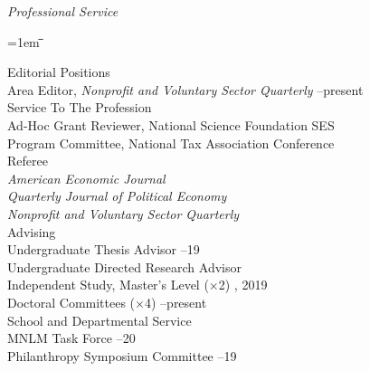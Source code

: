 \documentclass[12pt]{article}
\newlength{\midlength}
\newlength{\firstlength}
\newlength{\listindent}
\newlength{\dategap}
\newlength{\wrapgap}
\newcommand{\heading}[1]{
	{\setlength{\parskip}{0.8cm plus6mm minus3mm}
	\parindent=0pt
	\large \textit{{#1}}}
	\vspace{0.1em}
}
\newenvironment{datetabbing}{
	\begin{tabbing}
	\parskip=1em
	\hspace*{\listindent}\=\hspace*{\firstlength}\=\hspace*{\midlength}\= \kill
}{
	\end{tabbing}
}
\begin{document}
\clearpage
\heading{Professional Service}

\begin{datetabbing}	
\>  Editorial Positions																\\[\wrapgap]
\>	\>	Area Editor, \textit{Nonprofit and Voluntary Sector Quarterly}
															--present	\'	\\[\dategap]
\>  Service To The Profession														\\[\wrapgap]
\>	\>	Ad-Hoc Grant Reviewer, National Science Foundation SES				\'	\\[\wrapgap]
\>	\>	Program Committee, National Tax Association Conference 				\'	\\[\dategap]
\>	Referee																			\\[\wrapgap]
\>	\>	\textit{American Economic Journal}											\\[\wrapgap]
\>	\>	\textit{Quarterly Journal of Political Economy}								\\[\wrapgap]
\>	\>	\textit{Nonprofit and Voluntary Sector Quarterly}							\\[\dategap]
\>	Advising																		\\[\wrapgap]
\>	\>	Undergraduate Thesis Advisor 						--19	\'	\\[\wrapgap]
\>	\>	Undergraduate Directed Research Advisor						\'	\\[\wrapgap]
\>	\>	Independent Study, Master's Level ($\times$2)		, 2019	\'	\\[\wrapgap]
\>	\>	Doctoral Committees	 ($\times$4)						--present	\'	\\[\dategap]
\>	School and Departmental Service													\\[\wrapgap]
\>	\>	MNLM Task Force										--20	\'	\\[\wrapgap]
\>	\>	Philanthropy Symposium Committee						--19	\'	\\[\wrapgap]

\end{datetabbing}
\end{document}
